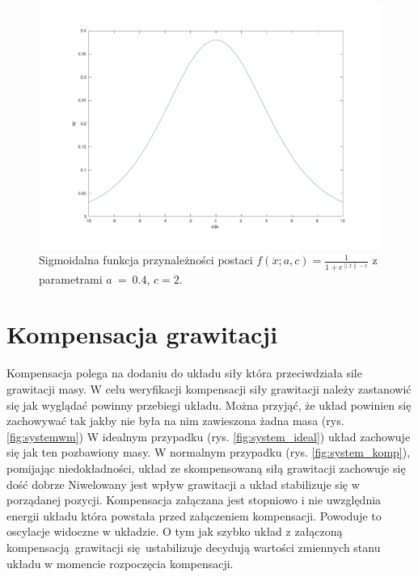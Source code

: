 \documentclass[a4paper, 10pt]{article}
\begin{document}
\begin{figure}[H]
	\includegraphics[width=0.99\linewidth]{system_w}
	\centering
	\caption{Sigmoidalna funkcja przynależności postaci $f(\ddot{x}; a, c) = \frac{1}{1+e^{\|\ddot{x}\|-c}}$ z parametrami $a~=~0.4$, $c = 2$.}
	\label{fig:system_w}
\end{figure}





\section{Kompensacja grawitacji}
Kompensacja polega na dodaniu do układu siły która przeciwdziała sile grawitacji masy.
W celu weryfikacji kompensacji siły grawitacji należy zastanowić się jak wyglądać powinny przebiegi układu. Można przyjąć, że układ powinien się zachowywać tak jakby nie była na nim zawieszona żadna masa (rys. \ref{fig:systemwm})
W idealnym przypadku (rys. \ref{fig:system_ideal}) układ zachowuje się jak ten pozbawiony masy. W normalnym przypadku (rys. \ref{fig:system_komp}), pomijając niedokładności, układ ze skompensowaną siłą grawitacji  zachowuje się dość dobrze Niwelowany jest wpływ grawitacji a układ stabilizuje się w porządanej pozycji. Kompensacja załączana jest stopniowo i nie uwzględnia energii układu która powstała przed załączeniem kompensacji. Powoduje to oscylacje widoczne w układzie. O tym jak szybko układ z załączoną kompensacją grawitacji się ustabilizuje decydują wartości zmiennych stanu układu w momencie rozpoczęcia kompensacji.
\end{document}
